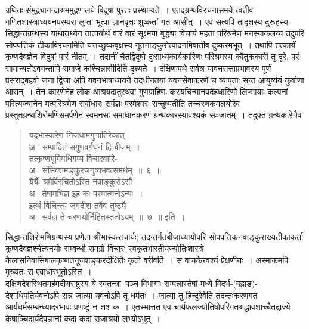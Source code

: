 \documentclass[11pt, openany]{book}
\begin{document}
\newpage

\begin{sloppypar}
\noindent ग्रथितः संमुद्र्यानन्दाश्रममुद्रणालये विदुषां पुरतः प्रस्थाप्यते~। एतद्ग्रन्थविरचनासमये त्वतीव गणितशास्त्राध्ययनपरम्परा लुप्ता भूत्वा ज्ञानवृक्षः शुष्कतां गत आसीत्~। एवं सत्यपि तादृशस्य दुरूहस्य सिद्धान्तग्रन्थस्य याथातथ्येन तात्पर्यार्थं वारं वारं सूक्ष्मया बुद्ध्या विचार्य महता परिश्रमेण मनस्याकलय्य तदुपरि सोपपत्तिकं टीकाविरचनमिति यत्तच्छुष्कवृक्षस्य नूतनाङ्कुरोत्पादनमिवातीव दुष्करमभूत्~। तथापि तत्कार्यं कृष्णदैवज्ञेन विदुषां पारं नीतम्~। तदानीं चैतद्विदुषो दुःसाध्यकार्यकारिणः परिश्रमस्य कौतुककारी तु दूरे, परं सामान्यतोऽवगन्तापि समाजे कश्चिन्नासीदिति दृश्यते~। दक्षिणापथे सर्वत्र यावनसत्ताप्रभावस्य पूर्णं प्रसराद्बहवो जना द्विजा अपि यवनभाषाध्ययने तदधीनतया यवनसेवाकरणे च व्यापृताः सन्त आयुर्व्ययं कुर्वाणा आसन्~। तेन कारणेनेह लोक आश्रयदातुरथवा गुणग्राहिणः कस्यचिन्मानवदेहधारिणो लिप्सायाः कल्पनां परित्यज्यानेन मत्परिश्रमेण सर्वाधारः सर्वज्ञः परमेश्वरः सन्तुष्यतीति तच्चरणकमलयोरेव प्रस्तुतग्रन्थशिरोमणिसमर्पणेन स्वमनसः समाधानकरणं ग्रन्थकारस्यावश्यकं सञ्जातम्~। तदुक्तं ग्रन्थकारेणैव\textendash 

\begin{quote}
{\color{violet}यद्भास्करेण निजधामगुणातिरेकात् \\
{\color{white}अ}~ सम्पादितं सगुणवर्गघनं हि बीजम्~।\\
तत्कृष्णभूमिमधिगम्य विचारवारि-\\
{\color{white}अ}~ संसिक्तमङ्कुरजनुष्यभवत्समर्थम्~॥~६~॥\\
यैर्यैः श्रमैर्विरचितोऽस्ति नवाङ्कुरोऽसौ\\
{\color{white}अ}~ तेषामभिज्ञ इह कः परमात्मनोऽन्यः~।\\
इत्थं विचिन्त्य जगदीश तवैव तुष्ट्यै\\
{\color{white}अ}~ सर्वज्ञ ते चरणयोर्निहितस्ततोऽयम्~॥~७~॥} इति~।
\end{quote}

सिद्धान्तशिरोमणिग्रन्थस्य प्रणेता श्रीभास्कराचार्यः, तदन्तर्गतबीजाध्यायोपरि सोपपत्तिकनवाङ्कुराख्यटीकाकर्ता कृष्णदैवज्ञश्चेत्यनयोः सम्बन्धी समग्रो विचारः स्वकृतभारतीयज्योतिःशास्त्रे कैलासनिवासिबालकृष्णतनूजशङ्करदीक्षितैः कृतो वरीवर्ति~। स वाचकैरवश्यं प्रेक्षणीयः~। अस्माकमपि मुख्यतः स एवाधारभूतोऽस्ति~।\\

दक्षिणदेशस्थितमहंमदीयराष्ट्रस्य ये स्वतन्त्राः पञ्च विभागाः सम्पन्नास्तेषां मध्ये विदर्भ-(वह्राड)-देशाधिपतिर्यवनोऽपि सन्न जात्या यवनोऽपि तु धर्मतः~। जात्या तु हिन्दुरेवेति तदन्तःकरणगत आर्यधर्मसम्बन्ध्यादरभावः प्रणष्टुं न शशाक~। एतस्मात्तत एव चार्यफलज्योतिषोपरिगतश्रद्धावशाच्चैतद्राज्ये केषाञ्चिदार्यदैवज्ञानां कदा कदा राजाश्रयो लभ्योऽभूत्~।
\end{sloppypar}
\end{document}
